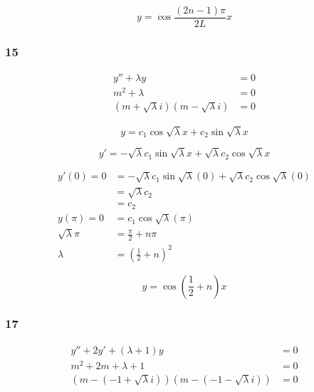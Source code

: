 \documentclass{article}
\begin{document}
\[y = \cos \frac{(2n - 1) \pi}{2 L} x\]

\subsubsection{15}

\begin{align*}
  y'' + \lambda y                             & = 0 \\
  m^2 + \lambda                               & = 0 \\
  (m + \sqrt \lambda i) (m - \sqrt \lambda i) & = 0
\end{align*}

\[y = c_1 \cos \sqrt \lambda x + c_2 \sin \sqrt \lambda x\]

\[y' = -\sqrt \lambda c_1 \sin \sqrt \lambda x + \sqrt \lambda c_2 \cos \sqrt \lambda x\]

\begin{align*}
  y'(0) = 0         & = -\sqrt \lambda c_1 \sin \sqrt \lambda (0) + \sqrt \lambda c_2 \cos \sqrt \lambda (0) \\
                    & = \sqrt \lambda c_2                                                                    \\
                    & = c_2                                                                                  \\
  y(\pi) = 0        & = c_1 \cos \sqrt \lambda (\pi)                                                         \\
  \sqrt \lambda \pi & = \frac{\pi}{2} + n \pi                                                                \\
  \lambda           & = \left( \frac{1}{2} + n \right)^2
\end{align*}

\[y = \cos \left( \frac{1}{2} + n \right) x\]

\subsubsection{17}

\begin{align*}
  y'' + 2 y' + (\lambda + 1) y                              & = 0 \\
  m^2 + 2 m + \lambda + 1                                   & = 0 \\
  (m - (-1 + \sqrt \lambda i)) (m - (-1 - \sqrt \lambda i)) & = 0
\end{align*}
\end{document}
